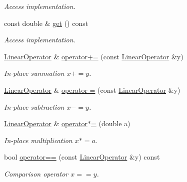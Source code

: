 \begin{DoxyCompactItemize}
\begin{DoxyCompactList}\small\item\em Access implementation. \end{DoxyCompactList}\item 
const double \& \hyperlink{classSpacy_1_1Mixin_1_1Get_ab00e550fb3ac8208d0a25e17e705a9fc}{get} () const\hypertarget{classSpacy_1_1Mixin_1_1Get_ab00e550fb3ac8208d0a25e17e705a9fc}{}\label{classSpacy_1_1Mixin_1_1Get_ab00e550fb3ac8208d0a25e17e705a9fc}

\begin{DoxyCompactList}\small\item\em Access implementation. \end{DoxyCompactList}\item 
\hyperlink{structSpacy_1_1Scalar_1_1LinearOperator}{Linear\+Operator} \& \hyperlink{classSpacy_1_1AddArithmeticOperators_afad1d01e1e8c6f75290ac46d9b047ea8}{operator+=} (const \hyperlink{structSpacy_1_1Scalar_1_1LinearOperator}{Linear\+Operator} \&y)
\begin{DoxyCompactList}\small\item\em In-\/place summation $ x+=y$. \end{DoxyCompactList}\item 
\hyperlink{structSpacy_1_1Scalar_1_1LinearOperator}{Linear\+Operator} \& \hyperlink{classSpacy_1_1AddArithmeticOperators_a9fa91e177d13203cfe8cfa991c64ca36}{operator-\/=} (const \hyperlink{structSpacy_1_1Scalar_1_1LinearOperator}{Linear\+Operator} \&y)
\begin{DoxyCompactList}\small\item\em In-\/place subtraction $ x-=y$. \end{DoxyCompactList}\item 
\hyperlink{structSpacy_1_1Scalar_1_1LinearOperator}{Linear\+Operator} \& \hyperlink{classSpacy_1_1AddArithmeticOperators_a1d3db95b24fd2bc1de712c9e04c47e2f}{operator$\ast$=} (double a)
\begin{DoxyCompactList}\small\item\em In-\/place multiplication $ x*=a$. \end{DoxyCompactList}\item 
bool \hyperlink{classSpacy_1_1AddArithmeticOperators_a5ff1909f49f4a705d69663dc2d4b6316}{operator==} (const \hyperlink{structSpacy_1_1Scalar_1_1LinearOperator}{Linear\+Operator} \&y) const
\begin{DoxyCompactList}\small\item\em Comparison operator $ x==y$. \end{DoxyCompactList}\end{DoxyCompactItemize}


